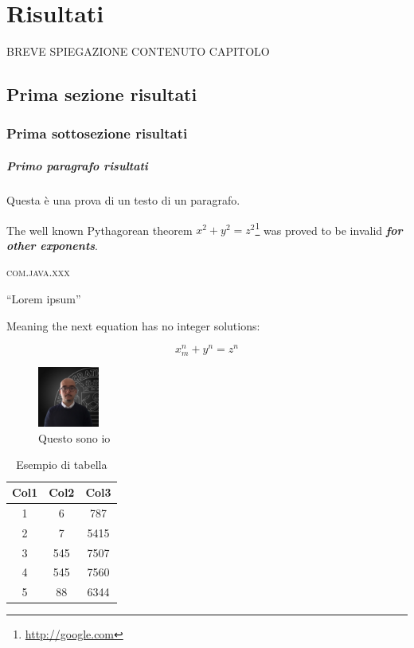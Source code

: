 \chapter{Risultati} %
%

\begin{citazione}
BREVE SPIEGAZIONE CONTENUTO CAPITOLO
\end{citazione}

\section{Prima sezione risultati}

\subsection{Prima sottosezione risultati}

\paragraph{Primo paragrafo risultati} Questa è una prova di un testo di un paragrafo.

The well known Pythagorean theorem $x^2 + y^2 = z^2$\footnote{\url{http://google.com}} was 
proved to be invalid \textbf{\textit{for other exponents}}. 

\textsc{com.java.xxx}

``Lorem ipsum''~\cite{di2017developer}

Meaning the next equation has no integer solutions:

\[ x^n_m + y^n = z^n \]

\begin{figure}[h]
\includegraphics[width=2cm]{immagini/picture_unisa.jpg}
\centering
\caption{Questo sono io}
\end{figure}

\begin{center}
\begin{table}[!h]
\begin{tabular}{||c c c ||}
 \hline
 Col1 & Col2 & Col3 \\ [0.5ex] 
 \hline\hline
 1 & 6 & 787 \\ 
 \hline
 2 & 7 & 5415 \\
 \hline
 3 & 545 & 7507 \\
 \hline
 4 & 545 & 7560 \\
 \hline
 5 & 88 & 6344 \\ [1ex] 
 \hline
\end{tabular}
\caption{Esempio di tabella}
\end{table}
\end{center}

